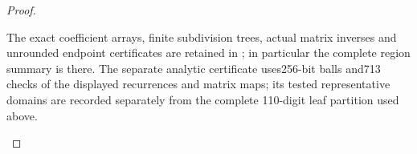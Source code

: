 \begin{proof}
\begin{enumerate}[label=\arabic*.]
The exact coefficient arrays, finite subdivision trees, actual
matrix inverses and unrounded endpoint certificates are retained
in ; in particular the complete
region summary is
 there.
The separate analytic certificate uses256-bit balls and713
checks of the displayed recurrences and matrix maps; its tested
representative domains are recorded separately from the complete
110-digit leaf partition used above.
\end{enumerate}
\end{proof}
